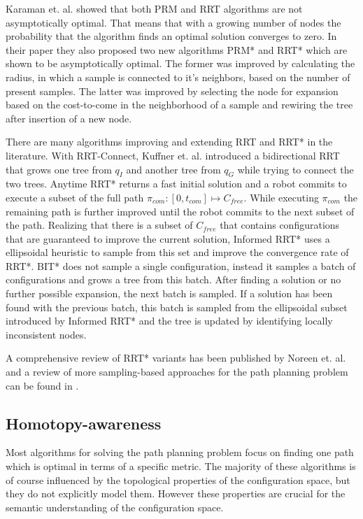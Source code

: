 \message{ !name(proposal.tex)}\documentclass[11pt,twocolumn]{article}
\begin{document}
Karaman et. al. \cite{karamanSamplingbasedAlgorithmsOptimal2011}
showed that both PRM and RRT algorithms are not asymptotically
optimal. That means that with a growing number of nodes the
probability that the algorithm finds an optimal solution converges to
zero. In their paper they also proposed two new algorithms PRM* and
RRT* which are shown to be asymptotically optimal. The former was
improved by calculating the radius, in which a sample is connected to
it's neighbors, based on the number of present samples. The latter was
improved by selecting the node for expansion based on the cost-to-come
in the neighborhood of a sample and rewiring the tree after insertion
of a new node.

There are many algorithms improving and extending RRT and RRT* in the
literature. With RRT-Connect, Kuffner et. al.
\cite{kuffnerRRTConnectEfficientApproach} introduced a bidirectional
RRT that grows one tree from \(q_I\) and another tree from \(q_G\)
while trying to connect the two trees. Anytime RRT*
\cite{karamanAnytimeMotionPlanning2011} returns a fast initial
solution and a robot commits to execute a subset of the full path
\(\pi_{com}: [0, t_{com}] \mapsto C_{free}\). While executing
\(\pi_{com}\) the remaining path is further improved until the robot
commits to the next subset of the path. Realizing that there is a
subset of \(C_{free}\) that contains configurations that are
guaranteed to improve the current solution, Informed RRT*
\cite{gammellInformedRRTOptimal2014} uses a ellipsoidal heuristic to
sample from this set and improve the convergence rate of RRT*. BIT*
\cite{gammellBatchInformedTrees2015} does not sample a single
configuration, instead it samples a batch of configurations and grows
a tree from this batch.  After finding a solution or no further
possible expansion, the next batch is sampled. If a solution has been
found with the previous batch, this batch is sampled from the
ellipsoidal subset introduced by Informed RRT* and the tree is updated
by identifying locally inconsistent nodes.

A comprehensive review of RRT* variants has been published by Noreen
et. al.  \cite{noreenOptimalPathPlanning2016a} and a review of more
sampling-based approaches for the path planning problem can be found
in \cite{elbanhawiSamplingBasedRobotMotion2014}.

\subsection*{Homotopy-awareness} Most algorithms for solving the path
planning problem focus on finding one path which is optimal in terms
of a specific metric. The majority of these algorithms is of course
influenced by the topological properties of the configuration space,
but they do not explicitly model them. However these properties are
crucial for the semantic understanding of the configuration space.
\end{document}

